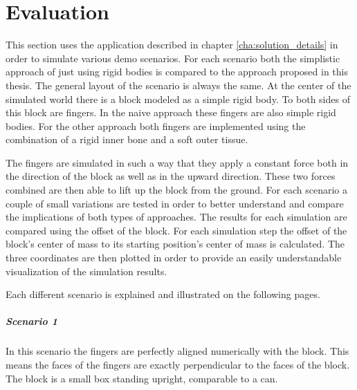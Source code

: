 \chapter{Evaluation}
\label{cha:evaluation}

This section uses the application described in chapter \ref{cha:solution_details} in order to simulate various demo scenarios. For each scenario both the simplistic approach of just using rigid bodies is compared to the approach proposed in this thesis. The general layout of the scenario is always the same. At the center of the simulated world there is a block modeled as a simple rigid body. To both sides of this block are fingers. In the naive approach these fingers are also simple rigid bodies. For the other approach both fingers are implemented using the combination of a rigid inner bone and a soft outer tissue.

The fingers are simulated in such a way that they apply a constant force both in the direction of the block as well as in the upward direction. These two forces combined are then able to lift up the block from the ground. For each scenario a couple of small variations are tested in order to better understand and compare the implications of both types of approaches. The results for each simulation are compared using the offset of the block. For each simulation step the offset of the block's center of mass to its starting position's center of mass is calculated. The three coordinates are then plotted in order to provide an easily understandable visualization of the simulation results. 

Each different scenario is explained and illustrated on the following pages.

\clearpage

\paragraph{Scenario 1}
In this scenario the fingers are perfectly aligned numerically with the block. This means the faces of the fingers are exactly perpendicular to the faces of the block. The block is a small box standing upright, comparable to a can.

